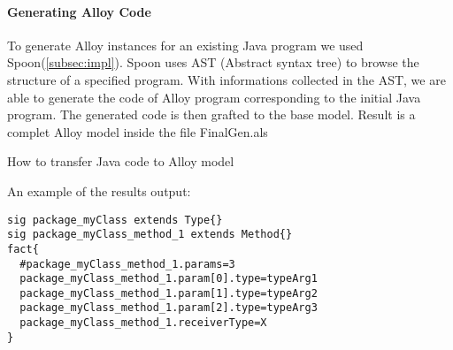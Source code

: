 \paragraph{Generating Alloy Code}
To generate Alloy instances for an existing Java program we used Spoon(\ref{subsec:impl}). Spoon uses AST (Abstract syntax tree)\cite{ast} to browse the structure of a specified program. With informations collected in the AST, we are able to generate the code of Alloy program corresponding to the initial Java program. The generated code is then grafted to the base model.
Result is a complet Alloy model inside the file FinalGen.als\\

\begin{algorithm}[H]
\SetAlgoLined
{}
\caption{How to transfer Java code to Alloy model}
\end{algorithm}
\bigskip
An example of the results output:
\begin{lstlisting}
sig package_myClass extends Type{}
sig package_myClass_method_1 extends Method{}
fact{
  #package_myClass_method_1.params=3
  package_myClass_method_1.param[0].type=typeArg1
  package_myClass_method_1.param[1].type=typeArg2
  package_myClass_method_1.param[2].type=typeArg3
  package_myClass_method_1.receiverType=X
}
\end{lstlisting}
